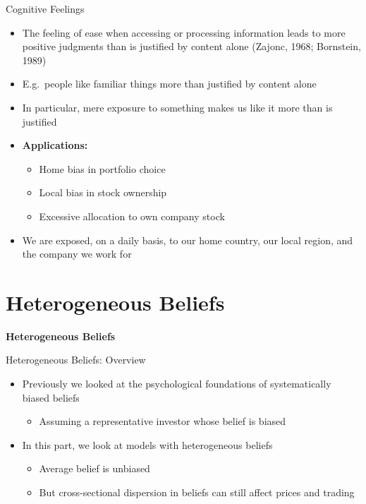 \documentclass[aspectratio=169, 11pt]{beamer}
\begin{document}
\begin{frame}{Cognitive Feelings}
\begin{itemize}
\item The feeling of ease when accessing or processing information leads to more positive judgments than is justified by content alone (Zajonc, 1968; Bornstein, 1989)
\item E.g.\ people like familiar things more than justified by content alone
\item In particular, mere exposure to something makes us like it more than is justified
\item \textbf{Applications:}
  \begin{itemize}
  \item Home bias in portfolio choice
  \item Local bias in stock ownership
  \item Excessive allocation to own company stock
  \end{itemize}
  \item We are exposed, on a daily basis, to our home country, our local region, and the company we work for 

\end{itemize}
\end{frame}

\section{Heterogeneous Beliefs}

\begin{frame}{}
\vfill
\centering
{\Large \textbf{Heterogeneous Beliefs}}
\vfill
\end{frame}

\begin{frame}{Heterogeneous Beliefs: Overview}
\begin{itemize}
\item Previously we looked at the psychological foundations of systematically biased beliefs
  \begin{itemize}
  \item Assuming a representative investor whose belief is biased
  \end{itemize}
\item In this part, we look at models with heterogeneous beliefs
  \begin{itemize}
  \item Average belief is unbiased
  \item But cross-sectional dispersion in beliefs can still affect prices and trading 
  \end{itemize}
\end{itemize}
\end{frame}
\end{document}
